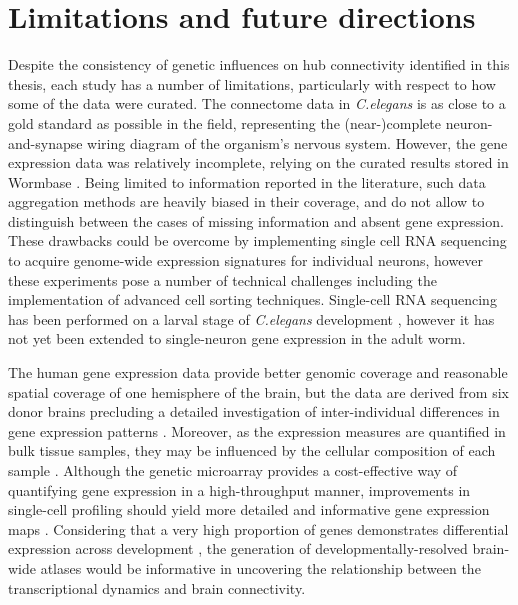 \section{Limitations and future directions}

Despite the consistency of genetic influences on hub connectivity identified in this thesis, each study has a number of limitations, particularly with respect to how some of the data were curated. The connectome data in \textit{C.elegans} is as close to a gold standard as possible in the field, representing the (near-)complete neuron-and-synapse wiring diagram of the organism's nervous system. However, the gene expression data was relatively incomplete, relying on the curated results stored in Wormbase \citep{Harris2010}. Being limited to  information reported in the literature, such data aggregation methods are heavily biased in their coverage, and do not allow to distinguish between the cases of missing information and absent gene expression. These drawbacks could be overcome by implementing single cell RNA sequencing to acquire genome-wide expression signatures for individual neurons, however these experiments pose a number of technical challenges including the implementation of advanced cell sorting techniques. Single-cell RNA sequencing has been performed on a larval stage of \textit{C.elegans} development \citep{Cao2017}, however it has not yet been extended to single-neuron gene expression in the adult worm.

The human gene expression data provide better genomic coverage and reasonable spatial coverage of one hemisphere of the brain, but the data are derived from six donor brains precluding a detailed investigation of inter-individual differences in gene expression patterns \citep{Arnatkeviciute2019,Hawrylycz2015}. Moreover, as the expression measures are quantified in bulk tissue samples, they may be influenced by the cellular composition of each sample \citep{Tasic2016}. Although the genetic microarray  provides a cost-effective way of quantifying gene expression in a high-throughput manner, improvements in single-cell profiling should yield more detailed and informative gene expression maps \citep{Lein2017}. Considering that a very high proportion of genes demonstrates differential expression across development \citep{Colantuoni2011}, the generation of developmentally-resolved brain-wide atlases would be informative in uncovering the relationship between the transcriptional dynamics and brain connectivity.

